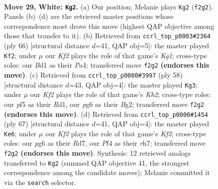 \documentclass[11pt]{article}
\begin{document}
\clearpage

\begin{figure}[p]\centering
\begin{subfigure}{0.46\textwidth}\centering
\resizebox{\linewidth}{!}{%
\newchessgame
\chessboard[
  setfen={r1b3k1/3n4/1p4p1/2p2p2/2P2P2/p1P3P1/P2B1K2/R2B4 w - - 7 29},
  showmover=false,
  pgfstyle=straightmove, color=movearrow, markmove={f2-g2}
]}
\caption{}
\end{subfigure}\hfill
\begin{subfigure}{0.46\textwidth}\centering
\resizebox{\linewidth}{!}{%
\newchessgame
\chessboard[
  setfen={8/1pp3pk/4n2p/P3Pp2/P7/R1B2P1P/6P1/3r2K1 w - - 0 34},
  showmover=false,
  pgfstyle=straightmove, color=movearrow, markmove={g1-f2}
]}
\caption{}
\end{subfigure}
\\[4pt]
\begin{subfigure}{0.46\textwidth}\centering
\resizebox{\linewidth}{!}{%
\newchessgame
\chessboard[
  setfen={3r2k1/5p2/3p2p1/2nP2Pp/5P2/2P4P/6BK/3R4 w - - 0 30},
  showmover=false,
  pgfstyle=straightmove, color=movearrow, markmove={h2-g3}
]}
\caption{}
\end{subfigure}\hfill
\begin{subfigure}{0.46\textwidth}\centering
\resizebox{\linewidth}{!}{%
\newchessgame
\chessboard[
  setfen={8/1p1r1k1R/1p6/4Bpp1/p3b3/P3P1PP/1P6/6K1 b - - 3 34},
  showmover=false,
  pgfstyle=straightmove, color=movearrow, markmove={f7-e6}
]}
\caption{}
\end{subfigure}
\caption{\textbf{Move 29, White: \texttt{Kg2}.} (a) Our position; Melanie plays \texttt{Kg2} (\texttt{f2g2}). Panels (b)--(d) are the retrieved master positions whose correspondence most drove this move (highest QAP objective among those that transfer to it). (b) Retrieved from \texttt{ccrl\_top\_p0003\#2364} (ply 66) [structural distance $d$=41, QAP obj=5]: the master played \texttt{Kf2}; under $\mu$ our \emph{Kf2} plays the role of that game's \emph{Kg1}; cross-type roles: our \emph{B}d1 as their \emph{P}a4; transferred move \texttt{f2g2} \textbf{(endorses this move)}. (c) Retrieved from \texttt{ccrl\_top\_p0000\#3997} (ply 58) [structural distance $d$=43, QAP obj=4]: the master played \texttt{Kg3}; under $\mu$ our \emph{Kf2} plays the role of that game's \emph{Kh2}; cross-type roles: our \emph{p}f5 as their \emph{R}d1, our \emph{p}g6 as their \emph{B}g2; transferred move \texttt{f2g2} \textbf{(endorses this move)}. (d) Retrieved from \texttt{ccrl\_top\_p0000\#1454} (ply 67) [structural distance $d$=41, QAP obj=4]: the master played \texttt{Ke6}; under $\mu$ our \emph{Kf2} plays the role of that game's \emph{Kf2}; cross-type roles: our \emph{p}g6 as their \emph{R}d7, our \emph{P}f4 as their \emph{r}h7; transferred move \texttt{f2g2} \textbf{(endorses this move)}. Synthesis: 12 retrieved analogs transferred to \texttt{Kg2} (summed QAP objective 41, the strongest correspondence among the candidate moves); Melanie committed it via the \texttt{search} selector.}
\label{fig:thought-m56}
\end{figure}
\end{document}
